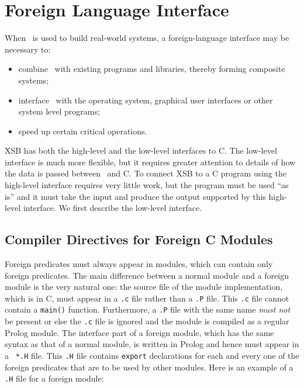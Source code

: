 \chapter{Foreign Language Interface}
\label{foreign}

When \ourprolog\ is used to build real-world systems, a foreign-language
interface may be necessary to:
\begin{itemize}
\item combine \ourprolog\ with existing programs and libraries, thereby
      forming composite systems;
\item interface \ourprolog\ with the operating system, graphical user 
      interfaces or other system level programs;
\item speed up certain critical operations.
\end{itemize}

XSB has both the high-level and the low-level interfaces to C.  The
low-level interface is much more flexible, but it requires greater
attention to details of how the data is passed between \ourprolog\ and C.
To connect XSB to a C program using the high-level interface requires very
little work, but the program must be used ``as is'' and it must take the
input and produce the output supported by this high-level interface.  We
first describe the low-level interface.

\section{Compiler Directives for Foreign C Modules}

Foreign predicates must always appear in modules, which can contain
only foreign predicates.  The main difference between a normal module
and a foreign module is the very natural one: the source file of the
module implementation, which is in C, must appear in a {\tt *.c} file
rather than a {\tt *.P} file.  This {\tt *.c} file cannot contain a
{\tt main()} function.  Furthermore, a {\tt *.P} file with the same
name {\em must not} be present or else the {\tt *.c} file is ignored
and the module is compiled as a regular Prolog module.  The interface
part of a foreign module, which has the same syntax as that of a
normal module, is written in Prolog and hence must appear in a {\tt
*.H} file.  This {\tt *.H} file contains {\tt export} declarations
for each and every one of the foreign predicates that are to be used
by other modules.  Here is an example of a {\tt .H} file for a foreign
module:

